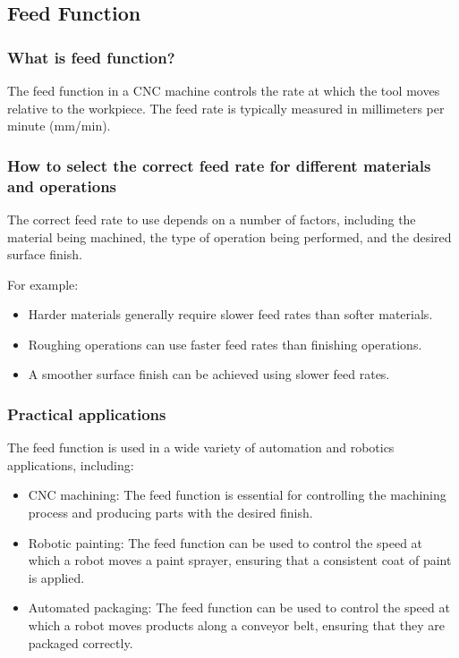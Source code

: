 \documentclass{article}
\begin{document}
\subsection*{Feed Function}

\subsubsection*{What is feed function?}
The feed function in a CNC machine controls the rate at which the tool moves relative to the workpiece. The feed rate is typically measured in millimeters per minute (mm/min).

\subsubsection*{How to select the correct feed rate for different materials and operations}
The correct feed rate to use depends on a number of factors, including the material being machined, the type of operation being performed, and the desired surface finish.

For example:
\begin{itemize}
    \item Harder materials generally require slower feed rates than softer materials.
    \item Roughing operations can use faster feed rates than finishing operations.
    \item A smoother surface finish can be achieved using slower feed rates.
\end{itemize}

\subsubsection*{Practical applications}
The feed function is used in a wide variety of automation and robotics applications, including:
\begin{itemize}
    \item CNC machining: The feed function is essential for controlling the machining process and producing parts with the desired finish.
    \item Robotic painting: The feed function can be used to control the speed at which a robot moves a paint sprayer, ensuring that a consistent coat of paint is applied.
    \item Automated packaging: The feed function can be used to control the speed at which a robot moves products along a conveyor belt, ensuring that they are packaged correctly.
\end{itemize}
\end{document}
